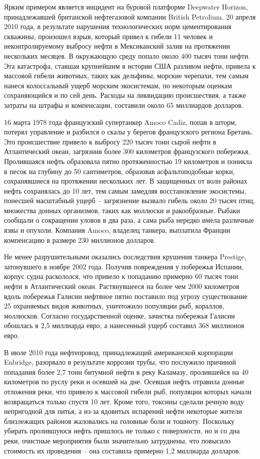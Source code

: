 Ярким примером является инцидент на буровой платформе Deepwater Horizon, принадлежавшей британской нефтегазовой компании British Petrolium. 20 апреля 2010 года, в результате нарушения технологических норм цементирования скважины, произошел взрыв, который привел к гибели 11 человек и неконтролируемому выбросу нефти в Мексиканский залив на протяжении нескольких месяцев. В окружающую среду попало около 400 тысяч тонн нефти. Эта катастрофа, ставшая крупнейшим в истории США разливом нефти, привела к массовой гибели животных, таких как дельфины, морские черепахи, тем самым нанеся колоссальный ущерб морским экосистемам, по некоторым оценкам сохраняющийся и по сей день. Расходы на ликвидацию происшествия, а также затраты на штрафы и компенсации, составили около 65 миллиардов долларов.

16 марта 1978 года французский супертанкер Amoco Cadiz, попав в шторм, потерял управление и разбился о скалы у берегов французского региона Бретань. Это происшествие привело к выбросу 220 тысяч тонн сырой нефти в Атлантический океан, загрязнив более 300 километров французского побережья. Пролившаяся нефть образовала пятно протяженностью 19 километров и поникла в песок на глубину до 50 сантиметров, образовав асфальтоподобные корки, сохранявшиеся на протяжении нескольких лет. В защищенных от волн районах нефть сохранялась до 10 лет, тем самым замедляя восстановление экосистемы, понесшей масштабный ущерб -- загрязнение вызвало гибель около 20 тысяч птиц, множества донных организмов, таких как моллюски и ракообразные. Рыбаки сообщали о сокращении уловов в два раза, а сама рыба нередко имела различные язвы и опухоли. Компания Amoco, владелец танкера, выплатила Франции компенсацию в размере 230 миллионов долларов.

Не менее разрушительными оказались последствия крушения танкера Prestige, затонувшего в ноябре 2002 года. Получив повреждения у побережья Испании, корпус судна раскололся, что привело к попаданию примерно 60 тысяч тонн нефти в Атлантический океан. Растянувшееся на более чем 2000 километров вдоль побережья Галисии нефтяное пятно поставило под угрозу существование 25 охраняемых видов животных, уничтожило популяции рыб, кораллов, моллюсков. Согласно государственной оценке, зачистка побережья Галисии обошлась в 2,5 миллиарда евро, а нанесенный ущерб составил 368 миллионов евро. 

В июле 2010 года нефтепровод, принадлежащий американской корпорации Enbridge, разорвало в результате коррозии трубы, что послужило причиной попадания более 2,7 тонн битумной нефти в реку Каламазу, пролившейся на 40 километров по руслу реки и осевшей на дне. Осевшая нефть отравила донные отложения реки, что привело к массовой гибели рыб, популяции которых начали возвращаться только спустя 10 лет. Кроме того, токсины сделали речную воду непригодной для питья, а из-за ядовитых испарений нефти некоторые жители близлежащих районов жаловались на головные боли и тошноту.  Поскольку убирать пролившуюся нефть пришлось не только с поверхности, но и со дна реки, очистные мероприятия были значительно затруднены, что повысило стоимость их проведения -- она составила примерно 1,2 миллиарда долларов.

